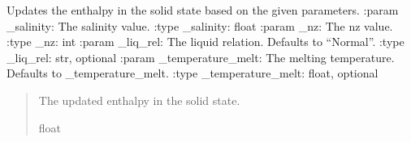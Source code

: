 \documentclass[a4paper,11pt,english,openany]{sphinxmanual}
\begin{document}

\begin{fulllineitems}
\label{\detokenize{api/spyice.update_physical_values:spyice.update_physical_values.update_enthalpy_solid_state}}
\pysigstartsignatures
{}
\pysigstopsignatures
\sphinxAtStartPar
Updates the enthalpy in the solid state based on the given parameters.
:param \_salinity: The salinity value.
:type \_salinity: float
:param \_nz: The nz value.
:type \_nz: int
:param \_liq\_rel: The liquid relation. Defaults to “Normal”.
:type \_liq\_rel: str, optional
:param \_temperature\_melt: The melting temperature. Defaults to \_temperature\_melt.
:type \_temperature\_melt: float, optional
\begin{quote}\begin{description}
\sphinxAtStartPar
The updated enthalpy in the solid state.

\sphinxAtStartPar
float

\end{description}\end{quote}

\end{fulllineitems}

\end{document}
